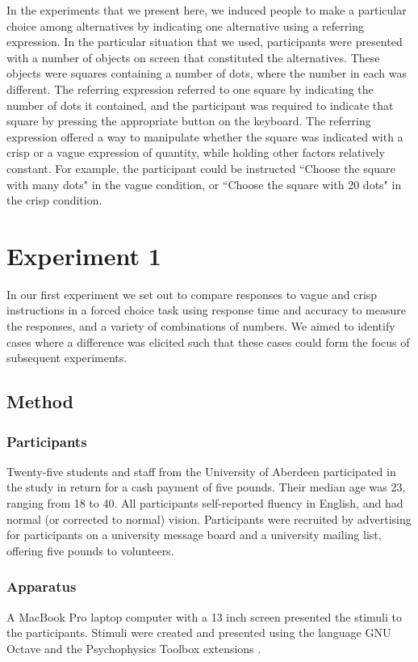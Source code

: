 \documentclass[doc,floatmark]{apa}
\begin{document}
In the experiments that we present here, we induced people to make a particular choice among alternatives by indicating one alternative using a referring expression.  In the particular situation that we used, participants were presented with a number of objects on screen that constituted the alternatives.  These objects were squares containing a number of dots, where the number in each was different. The referring expression referred to one square by indicating the number of dots it contained, and the participant was required to indicate that square by pressing the appropriate button on the keyboard. The referring expression offered a way to manipulate whether the square was indicated with a crisp or a vague expression of quantity, while holding other factors relatively constant. For example, the participant could be instructed ``Choose the square with many dots" in the vague condition, or ``Choose the square with 20 dots" in the crisp condition.

\section{Experiment 1} 
In our first experiment we set out to compare responses to vague and crisp instructions in a forced choice task using response time and accuracy to measure the responses, and a variety of combinations of numbers. We aimed to identify cases where a difference was elicited such that these cases could form the focus of  subsequent experiments.

\subsection{Method}

\subsubsection{Participants}
Twenty-five students and staff from the University of Aberdeen participated in the study in return for a cash payment of five pounds. Their median age was 23, ranging from 18 to 40. All participants self-reported fluency in English, and had normal (or corrected to normal) vision. Participants were recruited by advertising for participants on a university message board and a university mailing list, offering five pounds to volunteers. 

\subsubsection{Apparatus}
A MacBook Pro laptop computer with a 13 inch screen presented the stimuli to the participants. Stimuli were created and presented using the language GNU Octave \cite{eaton:2002} and the Psychophysics Toolbox extensions \cite{ptbx1, ptbx2}.
\end{document}
